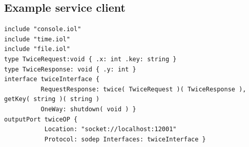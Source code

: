 \documentclass[12pt,a4paper]{article}
\begin{document}
\begin{appendices}
\section{Example service client}\label{app:exampleClient}
\begin{lstlisting}[caption={Example service client},label={lst:exampleServiceClient}]
include "console.iol"                                                                                                                                                                                        
include "time.iol"                                                                                                                                                                                           
include "file.iol"                                                                                                                                                                                           
type TwiceRequest:void { .x: int .key: string }                                                                                                                                                                                                            
type TwiceResponse: void { .y: int }                                                                                                                                                                                                            
interface twiceInterface {                                                                                                                                                                                   
          RequestResponse: twice( TwiceRequest )( TwiceResponse ), getKey( string )( string )                                                                                                                
          OneWay: shutdown( void ) }                                                                                                                                                                                                            
outputPort twiceOP {                                                                                                                                                                                         
           Location: "socket://localhost:12001"                                                                                                                                                              
           Protocol: sodep Interfaces: twiceInterface }                                                                                                                                                                                                                                                                                                                                                                                                                         

\end{lstlisting}
\end{appendices}
\end{document}
